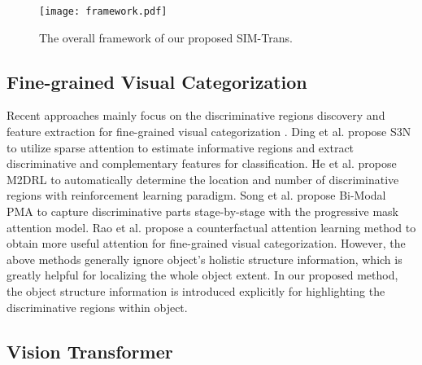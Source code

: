 \documentclass[sigconf, nonacm]{acmart}
\begin{document}
\begin{figure*}[!th]
  \centering
  \texttt{[image: framework.pdf]}
  \caption{The overall framework of our proposed SIM-Trans.}
  \label{framework}
\end{figure*}













\subsection{Fine-grained Visual Categorization}


Recent approaches mainly focus on the discriminative regions discovery and feature extraction for fine-grained visual categorization \cite{he2018fast, he2019and, ding2019selective, wang2020weakly, wang2020graph, song2020bi}. Ding et al. \cite{ding2019selective} propose S3N to utilize sparse attention to estimate informative regions and extract discriminative and complementary features for classification. He et al. \cite{he2019and} propose M2DRL to automatically determine the location and number of discriminative regions with reinforcement learning paradigm. Song et al. \cite{song2020bi} propose Bi-Modal PMA to capture discriminative parts stage-by-stage with the progressive mask attention model. Rao et al. \cite{rao2021counterfactual} propose a counterfactual attention learning method to obtain more useful attention for fine-grained visual categorization. However, the above methods generally ignore object’s holistic structure information, which is greatly helpful for localizing the whole object extent. In our proposed method, the object structure information is introduced explicitly for highlighting the discriminative regions within object.


\subsection{Vision Transformer}
\end{document}
